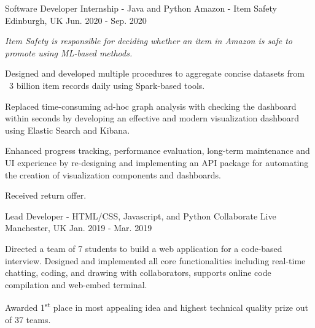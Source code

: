 \begin{cventries}
  \cventry
    {Software Developer Internship - Java and Python} %
    {Amazon - Item Safety} %
    {Edinburgh, UK} %
    {Jun. 2020 - Sep. 2020} %
    {
      \begin{cvitems} %
        \item {\textit{Item Safety is responsible for deciding whether an item in Amazon is safe to promote using ML-based methods.}}
        \item {Designed and developed multiple procedures to aggregate concise datasets from ~3 billion item records daily using Spark-based tools.}
        \item {Replaced time-consuming ad-hoc graph analysis with checking the dashboard within seconds by developing an effective and modern visualization dashboard using Elastic Search and Kibana.}
        \item {Enhanced progress tracking, performance evaluation, long-term maintenance and UI experience by re-designing and implementing an API package for automating the creation of visualization components and dashboards.}
        \item {Received return offer.}
      \end{cvitems}
    }

  \cventry
    {Lead Developer - HTML/CSS, Javascript, and Python} %
    {Collaborate Live} %
    {Manchester, UK} %
    {Jan. 2019 - Mar. 2019} %
    {
      \begin{cvitems} %
        \item {Directed a team of 7 students to build a web application for a code-based interview. Designed and implemented all core functionalities including real-time chatting, coding, and drawing with collaborators, supports online code compilation and web-embed terminal.}
        \item {Awarded 1\textsuperscript{st} place in most appealing idea and highest technical quality prize out of 37 teams.}
      \end{cvitems}
    }
\end{cventries}
